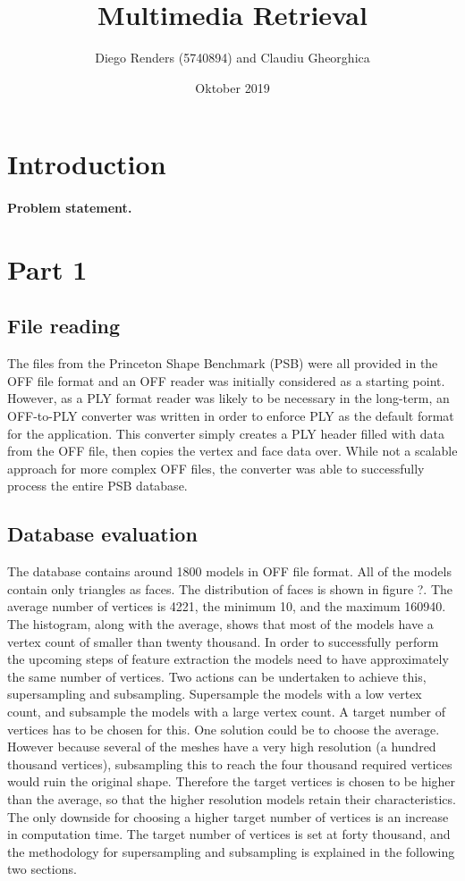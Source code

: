 \documentclass{bigdata}
\title{Multimedia Retrieval}
\author{Diego Renders (5740894) and Claudiu Gheorghica}
\date{Oktober 2019}
\begin{document}
\maketitle

\section{Introduction}

\paragraph*{Problem statement.}

\newpage

\section{Part 1}

\subsection{File reading}

The files from the Princeton Shape Benchmark (PSB) were all provided in the OFF file format and an OFF reader was initially considered as a starting point. However, as a PLY format reader was likely to be necessary in the long-term, an OFF-to-PLY converter was written in order to enforce PLY as the default format for the application.
This converter simply creates a PLY header filled with data from the OFF file, then copies the vertex and face data over. While not a scalable approach for more complex OFF files, the converter was able to successfully process the entire PSB database.

\subsection{Database evaluation}
The database contains around 1800 models in OFF file format. All of the models contain only triangles as faces. The distribution of faces is shown in figure ?. The average number of vertices is 4221, the minimum 10, and the maximum 160940. The histogram, along with the average, shows that most of the models have a vertex count of smaller than twenty thousand. In order to successfully perform the upcoming steps of feature extraction the models need to have approximately the same number of vertices. Two actions can be undertaken to achieve this, supersampling and subsampling. Supersample the models with a low vertex count, and subsample the models with a large vertex count. A target number of vertices has to be chosen for this. One solution could be to choose the average. However because several of the meshes have a very high resolution (a hundred thousand vertices), subsampling this to reach the four thousand required vertices would ruin the original shape. Therefore the target vertices is chosen to be higher than the average, so that the higher resolution models retain their characteristics. The only downside for choosing a higher target number of vertices is an increase in computation time. The target number of vertices is set at forty thousand, and the methodology for supersampling and subsampling is explained in the following two sections.
\end{document}
